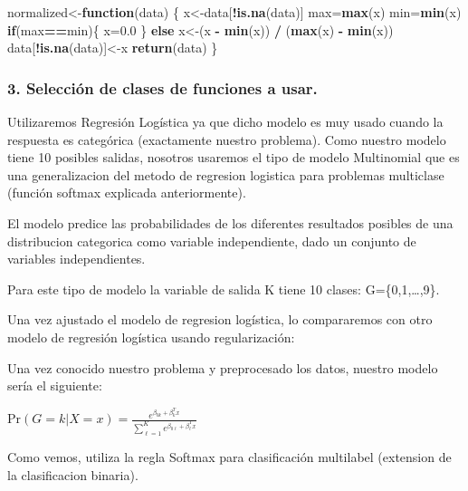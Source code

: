 \documentclass[]{article}
\newenvironment{Shaded}{\begin{snugshade}}{\end{snugshade}}
\newcommand{\KeywordTok}[1]{\textcolor[rgb]{0.13,0.29,0.53}{\textbf{#1}}}
\newcommand{\FloatTok}[1]{\textcolor[rgb]{0.00,0.00,0.81}{#1}}
\newcommand{\StringTok}[1]{\textcolor[rgb]{0.31,0.60,0.02}{#1}}
\newcommand{\ControlFlowTok}[1]{\textcolor[rgb]{0.13,0.29,0.53}{\textbf{#1}}}
\newcommand{\OperatorTok}[1]{\textcolor[rgb]{0.81,0.36,0.00}{\textbf{#1}}}
\newcommand{\NormalTok}[1]{#1}
\begin{document}
\begin{Shaded}
\begin{Highlighting}[]
\NormalTok{normalized<-}\ControlFlowTok{function}\NormalTok{(data) \{}
\NormalTok{  x<-data[}\OperatorTok{!}\KeywordTok{is.na}\NormalTok{(data)]}
\NormalTok{  max=}\KeywordTok{max}\NormalTok{(x)}
\NormalTok{  min=}\KeywordTok{min}\NormalTok{(x)}
  \ControlFlowTok{if}\NormalTok{(max}\OperatorTok{==}\NormalTok{min)\{}
\NormalTok{      x=}\FloatTok{0.0}
\NormalTok{    \}}
  \ControlFlowTok{else}
\NormalTok{    x<-(x }\OperatorTok{-}\StringTok{ }\KeywordTok{min}\NormalTok{(x)) }\OperatorTok{/}\StringTok{ }\NormalTok{(}\KeywordTok{max}\NormalTok{(x) }\OperatorTok{-}\StringTok{ }\KeywordTok{min}\NormalTok{(x))}
\NormalTok{  data[}\OperatorTok{!}\KeywordTok{is.na}\NormalTok{(data)]<-x}
  \KeywordTok{return}\NormalTok{(data)}
\NormalTok{\}}
\end{Highlighting}
\end{Shaded}

\subsubsection{3. Selección de clases de funciones a
usar.}\label{seleccion-de-clases-de-funciones-a-usar.}

Utilizaremos Regresión Logística ya que dicho modelo es muy usado cuando
la respuesta es categórica (exactamente nuestro problema). Como nuestro
modelo tiene 10 posibles salidas, nosotros usaremos el tipo de modelo
Multinomial que es una generalizacion del metodo de regresion logistica
para problemas multiclase (función softmax explicada anteriormente).

El modelo predice las probabilidades de los diferentes resultados
posibles de una distribucion categorica como variable independiente,
dado un conjunto de variables independientes.

Para este tipo de modelo la variable de salida K tiene 10 clases:
G=\{0,1,\ldots{},9\}.

Una vez ajustado el modelo de regresion logística, lo compararemos con
otro modelo de regresión logística usando regularización:

Una vez conocido nuestro problema y preprocesado los datos, nuestro
modelo sería el siguiente:

\(\mbox{Pr}(G=k|X=x)=\frac{e^{\beta_{0k}+\beta_k^Tx}}{\sum_{\ell=1}^Ke^{\beta_{0\ell}+\beta_\ell^Tx}}\)

Como vemos, utiliza la regla Softmax para clasificación multilabel
(extension de la clasificacion binaria).
\end{document}
